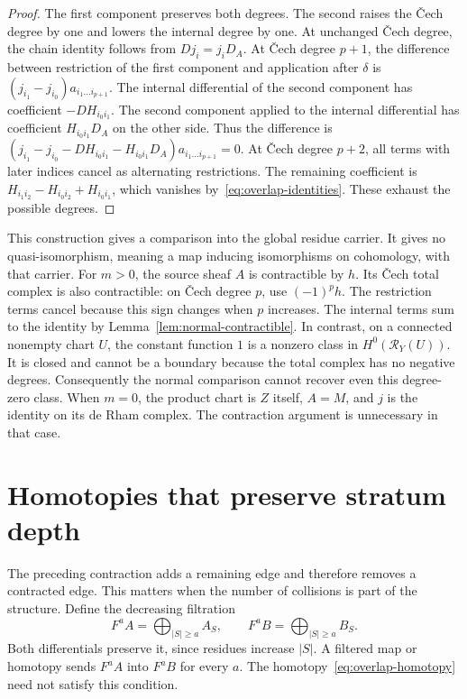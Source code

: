 \begin{proof}
The first component preserves both degrees.
The second raises the \v Cech degree by one and lowers the internal degree by one.
At unchanged \v Cech degree, the chain identity follows from $Dj_i=j_iD_A$.
At \v Cech degree $p+1$, the difference between restriction of the first component and application after $\delta$
is $(j_{i_1}-j_{i_0})a_{i_1\ldots i_{p+1}}$.
The internal differential of the second component has coefficient $-DH_{i_0i_1}$.
The second component applied to the internal differential has coefficient $H_{i_0i_1}D_A$ on the other side.
Thus the difference is
$(j_{i_1}-j_{i_0}-DH_{i_0i_1}-H_{i_0i_1}D_A)a_{i_1\ldots i_{p+1}}=0$.
At \v Cech degree $p+2$, all terms with later indices cancel as alternating restrictions.
The remaining coefficient is
$H_{i_1i_2}-H_{i_0i_2}+H_{i_0i_1}$, which vanishes by~\eqref{eq:overlap-identities}.
These exhaust the possible degrees.
\end{proof}

This construction gives a comparison into the global residue carrier.
It gives no quasi-isomorphism, meaning a map inducing isomorphisms on cohomology, with that carrier.
For $m>0$, the source sheaf $A$ is contractible by $h$.
Its \v Cech total complex is also contractible: on \v Cech degree $p$, use $(-1)^p h$.
The restriction terms cancel because this sign changes when $p$ increases.
The internal terms sum to the identity by Lemma~\ref{lem:normal-contractible}.
In contrast, on a connected nonempty chart $U$, the constant function $1$ is a nonzero class in $H^0(\mathcal R_Y(U))$.
It is closed and cannot be a boundary because the total complex has no negative degrees.
Consequently the normal comparison cannot recover even this degree-zero class.
When $m=0$, the product chart is $Z$ itself, $A=M$, and $j$ is the identity on its de Rham complex.
The contraction argument is unnecessary in that case.

\section{Homotopies that preserve stratum depth}
\label{sec:filtered-homotopies}

The preceding contraction adds a remaining edge and therefore removes a contracted edge.
This matters when the number of collisions is part of the structure.
Define the decreasing filtration
\[
F^aA=\bigoplus_{|S|\geq a}A_S,
\qquad
F^aB=\bigoplus_{|S|\geq a}B_S.
\]
Both differentials preserve it, since residues increase $|S|$.
A filtered map or homotopy sends $F^aA$ into $F^aB$ for every $a$.
The homotopy~\eqref{eq:overlap-homotopy} need not satisfy this condition.

